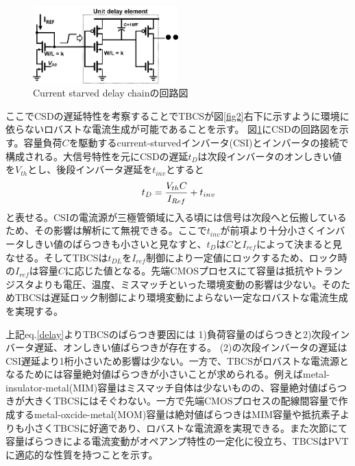 \documentclass[letterpaper, 10 pt, conference]{ieeeconf}  %
\begin{document}

\begin{figure}[!]
\centering
 \includegraphics[width=0.5\textwidth]{figs/inv.png}
  \caption{Current starved delay chainの回路図}
\label{inv}
\end{figure}

ここでCSDの遅延特性を考察することでTBCSが図\ref{fig2}右下に示すように環境に依らないロバストな電流生成が可能であることを示す。
図\ref{inv}にCSDの回路図を示す。容量負荷$C$を駆動するcurrent-sturvedインバータ(CSI)\cite{mroszczyk2014tunable}とインバータの接続で構成される。大信号特性を元にCSDの遅延$t_D$は次段インバータのオンしきい値を$V_{th}$とし、後段インバータ遅延を$t_{inv}$とすると
\begin{eqnarray}
    \centering
    t_D = \frac{V_{th}C}{I_{Ref}}+t_{inv}
    \label{delay}
\end{eqnarray}
と表せる。CSIの電流源が三極管領域に入る頃には信号は次段へと伝搬しているため、その影響は解析にて無視できる。ここで$t_{inv}$が前項より十分小さくインバータしきい値のばらつきも小さいと見なすと、$t_D$は$C$と$I_{ref}$によって決まると見なせる。そしてTBCSは$t_{DL}$を$I_{ref}$制御により一定値にロックするため、ロック時の$I_{ref}$は容量$C$に応じた値となる。先端CMOSプロセスにて容量は抵抗やトランジスタよりも電圧、温度、ミスマッチといった環境変動の影響は少ない。そのためTBCSは遅延ロック制御により環境変動によらない一定なロバストな電流生成を実現する。

上記eq.\ref{delay}よりTBCSのばらつき要因には 1)負荷容量のばらつきと2)次段インバータ遅延、オンしきい値ばらつきが存在する。
(2)の次段インバータの遅延はCSI遅延より1桁小さいため影響は少ない。一方で、TBCSがロバストな電流源となるためには容量絶対値ばらつきが小さいことが求められる。例えばmetal-insulator-metal(MIM)容量はミスマッチ自体は少ないものの、容量絶対値ばらつきが大きくTBCSにはそぐわない。一方で先端CMOSプロセスの配線間容量で作成するmetal-oxcide-metal(MOM)容量は絶対値ばらつきはMIM容量や抵抗素子よりも小さくTBCSに好適であり、ロバストな電流源を実現できる。また次節にて容量ばらつきによる電流変動がオペアンプ特性の一定化に役立ち、TBCSはPVTに適応的な性質を持つことを示す。
\end{document}
